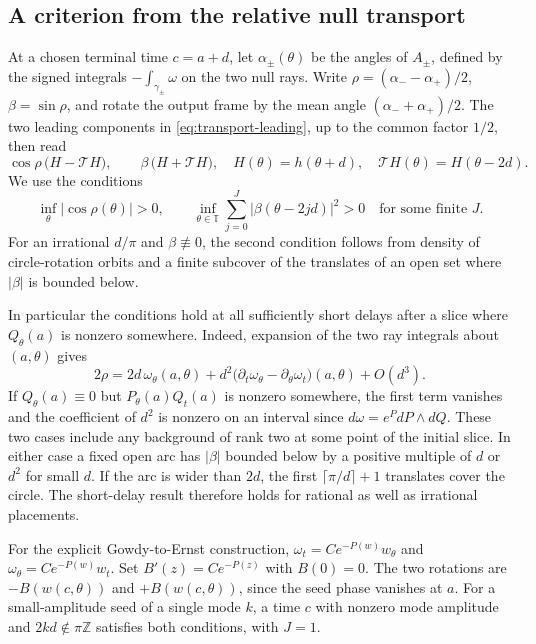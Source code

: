 \subsection{A criterion from the relative null transport}
At a chosen terminal time $c=a+d$, let $\alpha_\pm(\theta)$
be the angles of $A_\pm$, defined by the signed integrals
$-\int_{\gamma_\pm}\omega$ on the two null rays.
Write $\rho=(\alpha_- -\alpha_+)/2$, $\beta=\sin\rho$,
and rotate the output frame by the mean angle
$(\alpha_-+\alpha_+)/2$.
The two leading components in \eqref{eq:transport-leading},
up to the common factor $1/2$, then read
\[
 \cos\rho\,\big(H-\mathcal T H\big),\qquad
 \beta\,\big(H+\mathcal T H\big),
 \quad H(\theta)=h(\theta+d),\quad
 \mathcal T H(\theta)=H(\theta-2d).
\]
We use the conditions
\begin{equation}
 \inf_\theta|\cos\rho(\theta)|>0,\qquad
 \inf_{\theta\in\mathbb T}\sum_{j=0}^{J}
           |\beta(\theta-2jd)|^2>0
 \quad\text{for some finite }J .
 \label{eq:rotation-cover}
\end{equation}
For an irrational $d/\pi$ and $\beta\not\equiv0$,
the second condition follows from density of
circle-rotation orbits and a finite subcover of the
translates of an open set where $|\beta|$ is bounded below.

In particular the conditions hold at all sufficiently
short delays after a slice where $Q_\theta(a)$ is
nonzero somewhere. Indeed, expansion of the two ray
integrals about $(a,\theta)$ gives
\begin{equation}
 2\rho=2d\,\omega_\theta(a,\theta)
        +d^2\big(\partial_t\omega_\theta-
                  \partial_\theta\omega_t\big)(a,\theta)
        +O(d^3).
 \label{eq:relative-expansion}
\end{equation}
If $Q_\theta(a)\equiv0$ but $P_\theta(a)Q_t(a)$
is nonzero somewhere, the first term vanishes and the
coefficient of $d^2$ is nonzero on an interval since
$d\omega=e^{P}dP\wedge dQ$. These two cases include any
background of rank two at some point of the initial slice.
In either case a fixed open arc has $|\beta|$ bounded
below by a positive multiple of $d$ or $d^2$ for small
$d$. If the arc is wider than $2d$, the first
$\lceil\pi/d\rceil+1$ translates cover the circle.
The short-delay result therefore holds for rational
as well as irrational placements.

For the explicit Gowdy-to-Ernst construction,
$\omega_t=C e^{-P(w)}w_\theta$ and
$\omega_\theta=C e^{-P(w)}w_t$.
Set $B'(z)=C e^{-P(z)}$ with $B(0)=0$.
The two rotations are $-B(w(c,\theta))$ and
$+B(w(c,\theta))$, since the seed phase vanishes at $a$.
For a small-amplitude seed of a single mode $k$,
a time $c$ with nonzero mode amplitude and
$2kd\notin\pi\mathbb Z$ satisfies both conditions,
with $J=1$.

